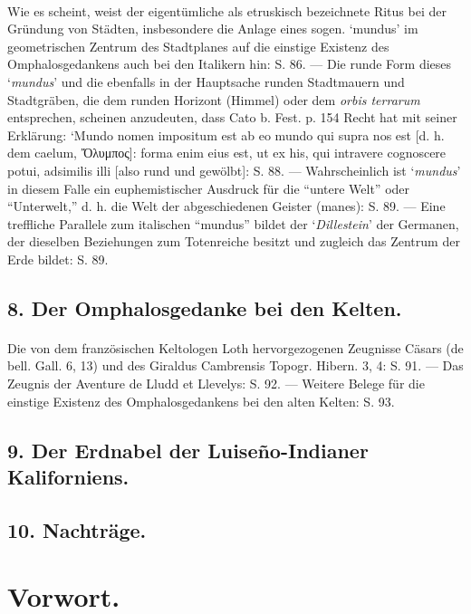 \documentclass[a4paper, 11pt, oneside]{article}
\begin{document}
\paragraph{}
Wie es scheint, weist der eigentümliche als etruskisch bezeichnete Ritus bei der Gründung von Städten, insbesondere die Anlage eines sogen. `mundus' im geometrischen Zentrum des Stadtplanes auf die einstige Existenz des Omphalosgedankens auch bei den Italikern hin: S. 86. --- Die runde Form dieses `\emph{mundus}' und die ebenfalls in der Hauptsache runden Stadtmauern und Stadtgräben, die dem runden Horizont (Himmel) oder dem \emph{orbis terrarum} entsprechen, scheinen anzudeuten, dass Cato b. Fest. p. 154 Recht hat mit seiner Erklärung: `Mundo nomen impositum est ab eo mundo qui supra nos est [d. h. dem caelum, Ὄλυμπος]: forma enim eius est, ut ex his, qui intravere cognoscere potui, adsimilis illi [also rund und gewölbt]: S. 88. --- Wahrscheinlich ist `\emph{mundus}' in diesem Falle ein euphemistischer Ausdruck für die "`untere Welt"' oder "`Unterwelt,"' d. h. die Welt der abgeschiedenen Geister (manes): S. 89. --- Eine treffliche Parallele zum italischen "`mundus"' bildet der `\emph{Dillestein}' der Germanen, der dieselben Beziehungen zum Totenreiche besitzt und zugleich das Zentrum der Erde bildet: S. 89.

\subsection*{8. Der Omphalosgedanke bei den Kelten.}
\paragraph{}
Die von dem französischen Keltologen Loth hervorgezogenen Zeugnisse Cäsars (de bell. Gall. 6, 13) und des Giraldus Cambrensis Topogr. Hibern. 3, 4: S. 91. --- Das Zeugnis der Aventure de Lludd et Llevelys: S. 92. --- Weitere Belege für die einstige Existenz des Omphalosgedankens bei den alten Kelten: S. 93.

\subsection*{9. Der Erdnabel der Luiseño-Indianer Kaliforniens.}
\subsection*{10. Nachträge.}
\clearpage
\section*{Vorwort.}
\end{document}
